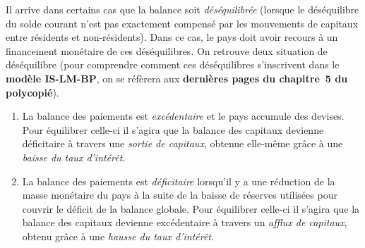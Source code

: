 Il arrive dans certains cas que la balance soit \emph{déséquilibrée} (lorsque le déséquilibre 
du solde courant n'est pas exactement compensé par les mouvements de capitaux 
entre résidents et non-résidents).
Dans ce cas, le pays doit avoir recours à un financement monétaire de ces déséquilibres.
On retrouve deux situation de déséquilibre (pour comprendre comment ces déséquilibres
s'inscrivent dans le \textbf{modèle IS-LM-BP},
on se réfèrera aux \textbf{dernières pages du chapitre~5 du polycopié}).
\begin{enumerate}
  \item La balance des paiements est \emph{excédentaire} et le pays accumule des devises.
  Pour équilibrer celle-ci il s'agira que la balance des capitaux devienne déficitaire à
  travers une \emph{sortie de capitaux}, 
  obtenue elle-même grâce à une \emph{baisse du taux d'intérêt}.
  \item La balance des paiements est \emph{déficitaire} lorsqu'il y a une réduction
  de la masse monétaire du pays à la suite de la baisse de réserves utilisées 
  pour couvrir le déficit de la balance globale.
  Pour équilibrer celle-ci il s'agira que la balance des capitaux devienne excédentaire à
  travers un \emph{afflux de capitaux}, 
  obtenu grâce à une \emph{hausse du taux d'intérêt}.
\end{enumerate}




